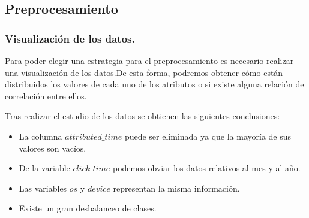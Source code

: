 \documentclass{beamer}
\theoremstyle{plain}
\theoremstyle{definition}
\theoremstyle{plain}
\theoremstyle{definition}
\theoremstyle{remark}
\theoremstyle{definition}
\begin{document}
\subsection{Preprocesamiento}
\begin{frame}
	\tableofcontents[currentsection,currentsubsection,sections=2]
\end{frame}
\begin{frame}
	\frametitle{Visualización de los datos.}
	Para poder elegir una estrategia para el preprocesamiento es necesario
	realizar una visualización de los datos.De esta forma, podremos obtener
	cómo están distribuidos los valores de cada uno de los atributos o si existe alguna relación de correlación entre ellos.
	\medskip
	
	Tras realizar el estudio de los datos se obtienen las siguientes conclusiones:
		\begin{itemize}
		\item La columna $attributed\_time$ puede ser eliminada ya que la mayoría de sus valores son vacíos.
		\item De la variable $click\_time$ podemos obviar los datos relativos al mes y al año.
		\item Las variables $os$ y $device$ representan la misma información.
		\item Existe un gran desbalanceo de clases.
	\end{itemize}
\end{frame}
\end{document}

